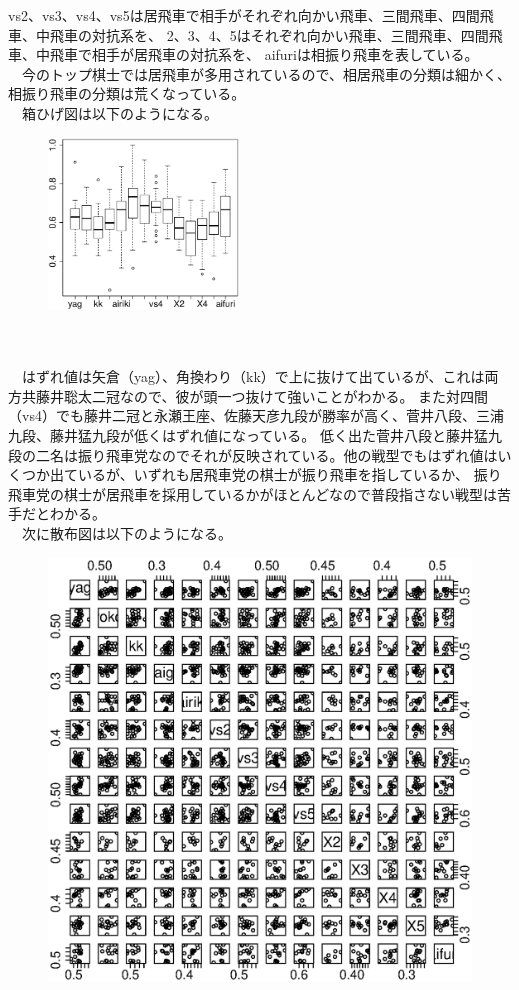 \documentclass[11pt,a4paper,dvipdfmx]{jsarticle}
\begin{document}
vs2、vs3、vs4、vs5は居飛車で相手がそれぞれ向かい飛車、三間飛車、四間飛車、中飛車の対抗系を、
2、3、4、5はそれぞれ向かい飛車、三間飛車、四間飛車、中飛車で相手が居飛車の対抗系を、
aifuriは相振り飛車を表している。
\\
　今のトップ棋士では居飛車が多用されているので、相居飛車の分類は細かく、相振り飛車の分類は荒くなっている。
\\
　箱ひげ図は以下のようになる。
\begin{figure}[h]
    \centering
    \includegraphics[width=0.45\textwidth]{graph/boxplot-raw.eps}
\end{figure}
\\
\\
　はずれ値は矢倉（yag）、角換わり（kk）で上に抜けて出ているが、これは両方共藤井聡太二冠なので、彼が頭一つ抜けて強いことがわかる。
また対四間（vs4）でも藤井二冠と永瀬王座、佐藤天彦九段が勝率が高く、菅井八段、三浦九段、藤井猛九段が低くはずれ値になっている。
低く出た菅井八段と藤井猛九段の二名は振り飛車党なのでそれが反映されている。他の戦型でもはずれ値はいくつか出ているが、いずれも居飛車党の棋士が振り飛車を指しているか、
振り飛車党の棋士が居飛車を採用しているかがほとんどなので普段指さない戦型は苦手だとわかる。
\\
　次に散布図は以下のようになる。
\\
\begin{figure}[h]
    \centering
    \includegraphics[width=1\textwidth]{graph/pairs-raw.eps}
\end{figure}
\end{document}
